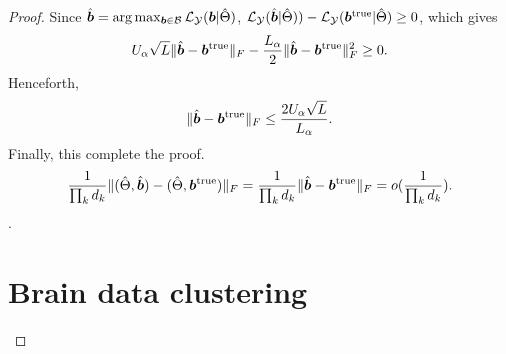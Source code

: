 \documentclass[11pt]{article}
\theoremstyle{plain}
\theoremstyle{definition}
\begin{document}
\begin{proof}
Since $\hat {\bm{b}}=\arg\max_{\bm{b}\in\mathcal{B}}\mathcal{L}_{\mathcal{Y}}(\bm{b}|\hat\Theta)$, $\mathcal{L}_{\mathcal{Y}}(\hat{\bm{b}}|\hat\Theta))-\mathcal{L}_{\mathcal{Y}}(\bm{b}^{\text{true}}|\hat\Theta)\geq 0$, which gives
\[
U_\alpha\sqrt{L}\lVert\hat{\bm{b}}-\bm{b}^{\text{true}}\rVert_F -\frac{L_\alpha}{2} \lVert\hat{\bm{b}}-\bm{b}^{\text{true}}\rVert_F^2\geq 0.
\]
Henceforth,
\[
\lVert\hat{\bm{b}}-\bm{b}^{\text{true}}\rVert_F\leq \frac{2U_\alpha \sqrt{L}}{L_\alpha}.
\]
Finally, this complete the proof.
\begin{equation}
  \frac{1}{\prod_k d_k}\lVert(\hat\Theta,\hat{\bm{b}})-(\hat\Theta,\bm{b}^{\text{true}})\rVert_F =\frac{1}{\prod_k d_k}\lVert\hat{\bm{b}}-\bm{b}^{\text{true}}\rVert_F
  = o(\frac{1}{\prod_k d_k}).
\end{equation}.

\section{Brain data clustering}


\end{proof}
\end{document}
